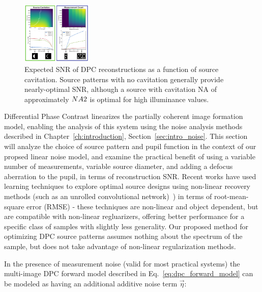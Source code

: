 \begin{figure}
  \label{fig:phase:dpc_cavitation}
  \begin{center}
    \includegraphics[width=0.3\textwidth]{figures/fig_phase_dpc_optimization_cavitation.pdf}
  \end{center}
  \caption{Expected SNR of DPC reconstructions as a function of source cavitation. Source patterns with no cavitation generally provide nearly-optimal SNR, although a source with cavitation NA of approximately $NA \/ 2$ is optimal for high illuminance values.}
\end{figure}

Differential Phase Contrast linearizes the partially coherent image formation model, enabling the analysis of this system using the noise analysis methods described in Chapter~\ref{ch:introduction}, Section~\ref{sec:intro_noise}. This section will analyze the choice of source pattern and pupil function in the context of our propsed linear noise model, and examine the practical benefit of using a variable number of measurements, variable source diameter, and adding a defocus aberration to the pupil, in terms of reconstruction SNR. Recent works have used learning techniques to explore optimal source designs using non-linear recovery methods (such as an unrolled convolutional network)~\cite{kellman2019physics}) in terms of root-mean-square error (RMSE) - these techniques are non-linear and object dependent, but are compatible with non-linear regluarizers, offering better performance for a specific class of samples with slightly less generality. Our proposed method for optimizing DPC source patterns assumes nothing about the spectrum of the sample, but does not take advantage of non-linear regularization methods.

In the presence of measurement noise (valid for most practical systems) the multi-image DPC forward model described in Eq.~\ref{eq:dpc_forward_model} can be modeled as having an additional additive noise term $\vec{\eta}$:

